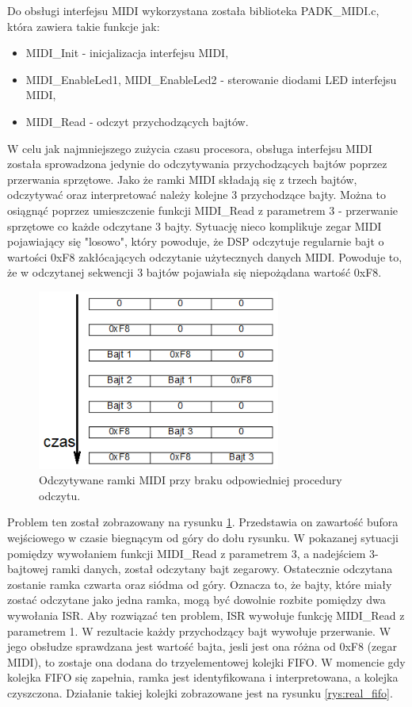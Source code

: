 Do obsługi interfejsu MIDI wykorzystana została biblioteka PADK\_MIDI.c, która zawiera takie funkcje jak:
\begin{itemize}
	\item MIDI\_Init - inicjalizacja interfejsu MIDI,
	\item MIDI\_EnableLed1, MIDI\_EnableLed2 - sterowanie diodami LED interfejsu MIDI,
	\item MIDI\_Read - odczyt przychodzących bajtów. 
\end{itemize}
W celu jak najmniejszego zużycia czasu procesora, obsługa interfejsu MIDI została sprowadzona jedynie do odczytywania przychodzących bajtów poprzez przerwania sprzętowe.
Jako że ramki MIDI składają się z trzech bajtów, odczytywać oraz interpretować należy kolejne 3 przychodzące bajty.
Można to osiągnąć poprzez umieszczenie funkcji MIDI\_Read z parametrem 3 - przerwanie sprzętowe co każde odczytane 3 bajty. Sytuację nieco komplikuje zegar MIDI pojawiający się "losowo", który powoduje, że DSP odczytuje regularnie bajt o wartości 0xF8 zakłócających odczytanie użytecznych danych MIDI. Powoduje to, że w odczytanej sekwencji 3 bajtów pojawiała się niepożądana wartość 0xF8.
\begin{figure}[H]
	\centering
	\includegraphics[width=8cm]{./grafiki/real_nofifo}
	\captionsetup{justification=centering}
	\caption{Odczytywane ramki MIDI przy braku odpowiedniej procedury odczytu.}
	\label{rys:real_nofifo}
\end{figure} 
Problem ten został zobrazowany na rysunku \ref{rys:real_nofifo}. Przedstawia on zawartość bufora wejściowego w czasie biegnącym od góry do dołu rysunku. W pokazanej sytuacji pomiędzy wywołaniem funkcji MIDI\_Read z parametrem 3, a nadejściem 3-bajtowej ramki danych, został odczytany bajt zegarowy. Ostatecznie odczytana zostanie ramka czwarta oraz siódma od góry.  Oznacza to, że bajty, które miały zostać odczytane jako jedna ramka, mogą być dowolnie rozbite pomiędzy dwa wywołania ISR. 
Aby rozwiązać ten problem, ISR wywołuje funkcję MIDI\_Read z parametrem 1. W rezultacie każdy przychodzący bajt wywołuje przerwanie. W jego obsłudze sprawdzana jest wartość bajta, jesli jest ona różna od 0xF8 (zegar MIDI), to zostaje ona dodana do trzyelementowej kolejki FIFO. W momencie gdy kolejka FIFO się zapełnia, ramka jest identyfikowana i interpretowana, a kolejka czyszczona. Działanie takiej kolejki zobrazowane jest na rysunku \ref{rys:real_fifo}.
